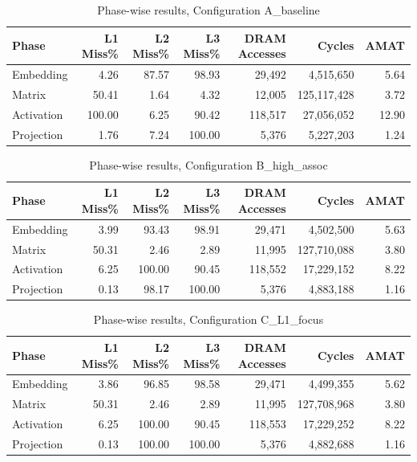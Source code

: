 \begin{table}[H]
\centering
\begin{tabular}{lrrrrrr}
\toprule
Phase & L1 Miss\% & L2 Miss\% & L3 Miss\% & DRAM Accesses & Cycles & AMAT \\
\midrule
Embedding & 4.26 & 87.57 & 98.93 & 29,492 & 4,515,650 & 5.64 \\
Matrix & 50.41 & 1.64 & 4.32 & 12,005 & 125,117,428 & 3.72 \\
Activation & 100.00 & 6.25 & 90.42 & 118,517 & 27,056,052 & 12.90 \\
Projection & 1.76 & 7.24 & 100.00 & 5,376 & 5,227,203 & 1.24 \\
\bottomrule
\end{tabular}
\caption{Phase-wise results, Configuration A\_baseline}
\label{tab:phase-A_baseline}
\end{table}

\begin{table}[H]
\centering
\begin{tabular}{lrrrrrr}
\toprule
Phase & L1 Miss\% & L2 Miss\% & L3 Miss\% & DRAM Accesses & Cycles & AMAT \\
\midrule
Embedding & 3.99 & 93.43 & 98.91 & 29,471 & 4,502,500 & 5.63 \\
Matrix & 50.31 & 2.46 & 2.89 & 11,995 & 127,710,088 & 3.80 \\
Activation & 6.25 & 100.00 & 90.45 & 118,552 & 17,229,152 & 8.22 \\
Projection & 0.13 & 98.17 & 100.00 & 5,376 & 4,883,188 & 1.16 \\
\bottomrule
\end{tabular}
\caption{Phase-wise results, Configuration B\_high\_assoc}
\label{tab:phase-B_high_assoc}
\end{table}

\begin{table}[H]
\centering
\begin{tabular}{lrrrrrr}
\toprule
Phase & L1 Miss\% & L2 Miss\% & L3 Miss\% & DRAM Accesses & Cycles & AMAT \\
\midrule
Embedding & 3.86 & 96.85 & 98.58 & 29,471 & 4,499,355 & 5.62 \\
Matrix & 50.31 & 2.46 & 2.89 & 11,995 & 127,708,968 & 3.80 \\
Activation & 6.25 & 100.00 & 90.45 & 118,553 & 17,229,252 & 8.22 \\
Projection & 0.13 & 100.00 & 100.00 & 5,376 & 4,882,688 & 1.16 \\
\bottomrule
\end{tabular}
\caption{Phase-wise results, Configuration C\_L1\_focus}
\label{tab:phase-C_L1_focus}
\end{table}

